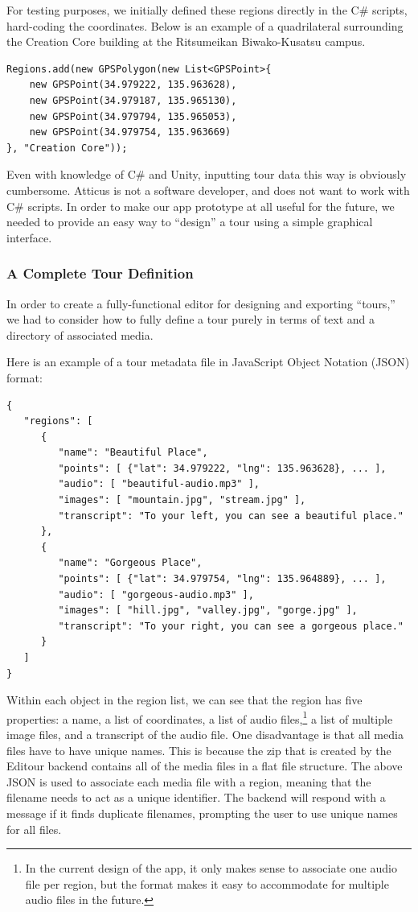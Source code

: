 \documentclass[a4paper, 10pt, american, titlepage]{article}
\begin{document}
For testing purposes, we initially defined these regions directly in the C\#
scripts, hard-coding the coordinates. Below is an example of a quadrilateral
surrounding the Creation Core building at the Ritsumeikan Biwako-Kusatsu campus.

\begin{verbatim}
Regions.add(new GPSPolygon(new List<GPSPoint>{
    new GPSPoint(34.979222, 135.963628),
    new GPSPoint(34.979187, 135.965130),
    new GPSPoint(34.979794, 135.965053),
    new GPSPoint(34.979754, 135.963669)
}, "Creation Core"));
\end{verbatim}

Even with knowledge of C\# and Unity, inputting tour data this way is obviously
cumbersome. Atticus is not a software developer, and does not want to work with
C\# scripts. In order to make our app prototype at all useful for the future,
we needed to provide an easy way to ``design'' a tour using a simple graphical
interface.

\subsubsection{A Complete Tour Definition}
\label{sec:tourDefinition}

In order to create a fully-functional editor for designing and exporting
``tours,'' we had to consider how to fully define a tour purely in terms
of text and a directory of associated media.

Here is an example of a tour metadata file in JavaScript Object Notation (JSON)
format:

\begin{verbatim}
{
   "regions": [
      {
         "name": "Beautiful Place",
         "points": [ {"lat": 34.979222, "lng": 135.963628}, ... ],
         "audio": [ "beautiful-audio.mp3" ],
         "images": [ "mountain.jpg", "stream.jpg" ],
         "transcript": "To your left, you can see a beautiful place."
      },
      {
         "name": "Gorgeous Place",
         "points": [ {"lat": 34.979754, "lng": 135.964889}, ... ],
         "audio": [ "gorgeous-audio.mp3" ],
         "images": [ "hill.jpg", "valley.jpg", "gorge.jpg" ],
         "transcript": "To your right, you can see a gorgeous place."
      }
   ]
}
\end{verbatim}

Within each object in the region list, we can see that the region has five
properties: a name, a list of coordinates, a list of audio files,\footnote{In
the current design of the app, it only makes sense to associate one audio file
per region, but the format makes it easy to accommodate for multiple audio
files in the future.} a list of multiple image files, and a transcript of the
audio file. One disadvantage is that all media files have to have unique names.
This is because the zip that is created by the Editour backend contains all of
the media files in a flat file structure. The above JSON is used to associate
each media file with a region, meaning that the filename needs to act as a
unique identifier. The backend will respond with a message if it finds
duplicate filenames, prompting the user to use unique names for all files.
\end{document}
